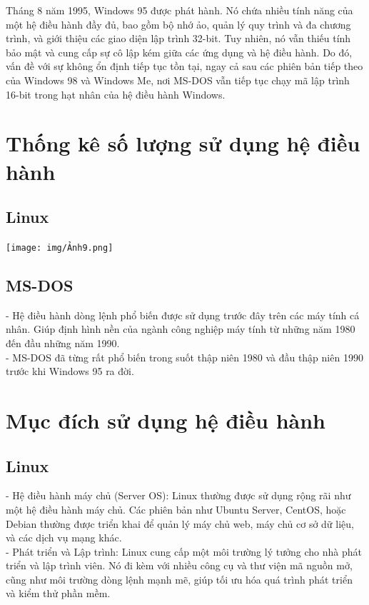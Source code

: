 \documentclass[12pt,a4paper]{article}
\begin{document}
Tháng 8 năm 1995, Windows 95 được phát hành. Nó chứa nhiều tính năng của một hệ điều hành đầy đủ, bao gồm bộ nhớ ảo, quản lý quy trình và đa chương trình, và giới thiệu các giao diện lập trình 32-bit. Tuy nhiên, nó vẫn thiếu tính bảo mật và cung cấp sự cô lập kém giữa các ứng dụng và hệ điều hành. Do đó, vấn đề với sự không ổn định tiếp tục tồn tại, ngay cả sau các phiên bản tiếp theo của Windows 98 và Windows Me, nơi MS-DOS vẫn tiếp tục chạy mã lập trình 16-bit trong hạt nhân của hệ điều hành Windows.


\section{Thống kê số lượng sử dụng hệ điều hành}
\subsection{Linux}
\begin{center}
	\texttt{[image: img/Ảnh9.png]}
\end{center}
\subsection{MS-DOS}
- Hệ điều hành dòng lệnh phổ biến được sử dụng trước đây trên các máy tính cá nhân. Giúp định hình nền của ngành công nghiệp máy tính từ những năm 1980 đến đầu những năm 1990.\\

- MS-DOS đã từng rất phổ biến trong suốt thập niên 1980 và đầu thập niên 1990  trước khi Windows 95 ra đời.

\section{Mục đích sử dụng hệ điều hành}
\subsection{Linux}
- Hệ điều hành máy chủ (Server OS): Linux thường được sử dụng rộng rãi như một hệ điều hành máy chủ. Các phiên bản như Ubuntu Server, CentOS, hoặc Debian thường được triển khai để quản lý máy chủ web, máy chủ cơ sở dữ liệu, và các dịch vụ mạng khác.\\

- Phát triển và Lập trình: Linux cung cấp một môi trường lý tưởng cho nhà phát triển và lập trình viên. Nó đi kèm với nhiều công cụ và thư viện mã nguồn mở, cũng như môi trường dòng lệnh mạnh mẽ, giúp tối ưu hóa quá trình phát triển và kiểm thử phần mềm.\\
\end{document}
